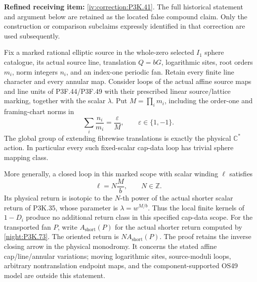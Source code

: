 \begin{theorem}\hypertarget{tag-02UM}{}\label{night:P3K.41}

\par\noindent\textbf{Refined receiving item:} \cref{iv:correction:P3K.41}. The full historical statement and argument below are retained as the located false compound claim. Only the construction or comparison subclaims expressly identified in that correction are used subsequently.

Fix a marked rational elliptic source in the whole-zero selected
\(I_1\) sphere catalogue, its actual source line, translation
\(Q=bG\), logarithmic sites, root orders \(m_i\), norm integers
\(n_i\), and an index-one periodic fan. Retain every finite line
character and every annular map. Consider loops of the actual affine
source maps and line units of P3F.44/P3F.49 with their prescribed
linear source/lattice marking, together with the scalar \(\lambda\).
Put \(M=\prod_i m_i\), including the order-one and framing-chart
norms in
\[
           \sum_i\frac{n_i}{m_i}=\frac{\varepsilon}{M},
                \qquad\varepsilon\in\{1,-1\}.
\]
The global group of extending fibrewise translations is exactly
the physical \(\mathbb C^*\) action. In particular every such
fixed-scalar cap-data loop has trivial sphere mapping class.

More generally, a closed loop in this marked scope with scalar
winding \(\ell\) satisfies
\[
                       \ell=N\frac{M}{b},\qquad N\in\mathbb Z.
\]
Its physical return is isotopic to the \(N\)-th power of the
actual shorter scalar return of P3K.35, whose parameter is
\(\lambda=w^{M/b}\). Thus the local finite kernels of \(1-D_i\)
produce no additional return class in this specified cap-data scope.
For the transported fan \(P\), write \(A_{\mathrm{short}}(P)\)
for the actual shorter return computed by \cref{night:P3K.73}.
The oriented return is \(N A_{\mathrm{short}}(P)\).
The proof retains the inverse closing arrow in the
physical monodromy. It concerns the stated affine cap/line/annular
variations; moving logarithmic sites, source-moduli loops, arbitrary
nontranslation endpoint maps, and the component-supported OS49
model are outside this statement.


\end{theorem}


